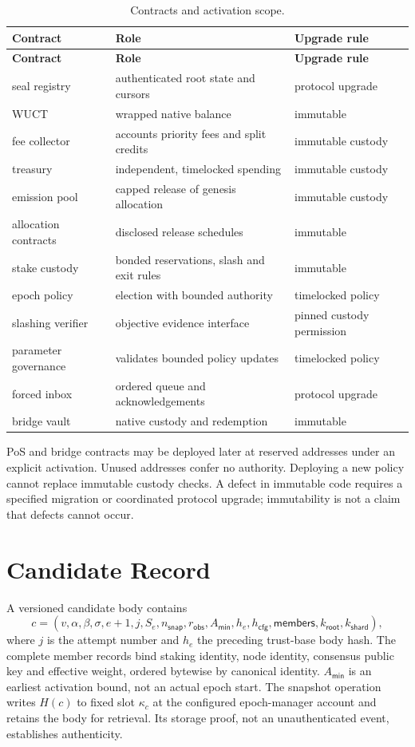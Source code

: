 \begin{longtable}{p{3.2cm}p{7.0cm}p{3.0cm}}
\caption{Contracts and activation scope.}\label{ta:evm-genesis}\\
\textbf{Contract} & \textbf{Role} & \textbf{Upgrade rule}\\ \hline
\endfirsthead
\textbf{Contract} & \textbf{Role} & \textbf{Upgrade rule}\\ \hline
\endhead
seal registry & authenticated root state and cursors & protocol upgrade\\
WUCT & wrapped native balance & immutable\\
fee collector & accounts priority fees and split credits & immutable custody\\
treasury & independent, timelocked spending & immutable custody\\
emission pool & capped release of genesis allocation & immutable custody\\
allocation contracts & disclosed release schedules & immutable\\
stake custody & bonded reservations, slash and exit rules & immutable\\
epoch policy & election with bounded authority & timelocked policy\\
slashing verifier & objective evidence interface & pinned custody permission\\
parameter governance & validates bounded policy updates & timelocked policy\\
forced inbox & ordered queue and acknowledgements & protocol upgrade\\
bridge vault & native custody and redemption & immutable\\
\end{longtable}

PoS and bridge contracts may be deployed later at reserved addresses under an explicit activation. Unused addresses confer no authority. Deploying a new policy cannot replace immutable custody checks. A defect in immutable code requires a specified migration or coordinated protocol upgrade; immutability is not a claim that defects cannot occur.

\section{Candidate Record}\label{app:gov-candidate}

A versioned candidate body contains
\[
 c=(v,\alpha,\beta,\sigma,e+1,j,S_e,n_\mathsf{snap},r_\mathsf{obs},
       A_\mathsf{min},h_e,h_\mathsf{cfg},\mathsf{members},k_\mathsf{root},k_\mathsf{shard}),
\]
where $j$ is the attempt number and $h_e$ the preceding trust-base body hash. The complete member records bind staking identity, node identity, consensus public key and effective weight, ordered bytewise by canonical identity. $A_\mathsf{min}$ is an earliest activation bound, not an actual epoch start. The snapshot operation writes $H(c)$ to fixed slot $\kappa_c$ at the configured epoch-manager account and retains the body for retrieval. Its storage proof, not an unauthenticated event, establishes authenticity.


